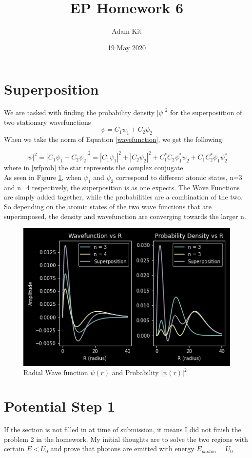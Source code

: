 \documentclass{article}
\title{EP Homework 6}
\author{Adam Kit}
\date{19 May 2020}
\begin{document}
\maketitle
\section{Superposition}
We are tasked with finding the probability density $|\psi |^2$ for the superposiition of two stationary wavefunctions
\begin{equation}
\psi = C_1 \psi_1 + C_2 \psi_2
\label{wavefunction}
\end{equation}
When we take the norm of Equation \ref{wavefunction}, we get the following:

\begin{equation}
|\psi |^2 = |C_1 \psi_1 + C_2 \psi_2 |^2 = |C_1 \psi_1 |^2 + |C_2 \psi_2 |^2 + C_1^*C_2 \psi_1^* \psi_2 + C_1 C_2^* \psi_1 \psi_2^*
\label{wfprob}
\end{equation}
where in \ref{wfprob} the star represents the complex conjugate. \\ As seen in Figure \ref{superposition1}, when $\psi_1$ and $\psi_2$ correspond to different atomic states, n=3 and n=4 respectively, the superposition is as one expects. The Wave Functions are simply added together, while the probabilities are a combination of the two. So depending on the atomic states of the two wave functions that are superimposed, the density and wavefunction are converging towards the larger n.


\begin{figure}
  \centering
  \includegraphics[scale=0.8]{superposition1.png}
  \caption{Radial Wave function $\psi (r)$ and Probability $|\psi (r) |^2$ }
  \label{superposition1}
\end{figure}
\section{Potential Step 1 }
If the section is not filled in at time of submission, it means I did not finish the problem 2 in the homework. My initial thoughts are to solve the two regions with certain $E < U_0 $ and prove that photons are emitted with energy $E_{photon} = U_0$
\end{document}
